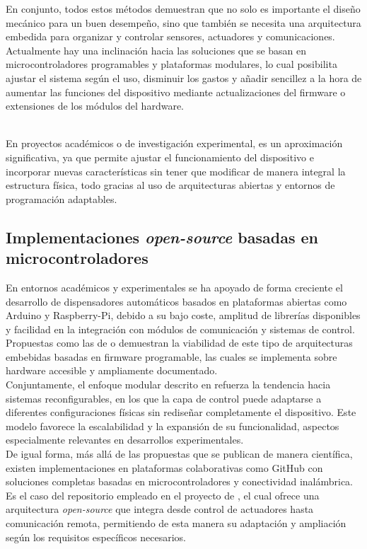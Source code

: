 En conjunto, todos estos métodos demuestran que no solo es importante el diseño mecánico para un buen desempeño, sino que también se necesita una arquitectura embedida para organizar y controlar sensores, actuadores y comunicaciones. Actualmente hay una inclinación hacia las soluciones que se basan en microcontroladores programables y plataformas modulares, lo cual posibilita ajustar el sistema según el uso, disminuir los gastos y añadir sencillez a la hora de aumentar las funciones del dispositivo mediante actualizaciones del firmware o extensiones de los módulos del hardware.\\

\

En proyectos académicos o de investigación experimental, es un aproximación significativa, ya que permite ajustar el funcionamiento del dispositivo e incorporar nuevas características sin tener que modificar de manera integral la estructura física, todo gracias al uso de arquitecturas abiertas y entornos de programación adaptables.\\

\subsection{Implementaciones \textit{open-source} basadas en microcontroladores}
\label{subsec:open_source_microcontroladores}

En entornos académicos y experimentales se ha apoyado de forma creciente el desarrollo de dispensadores automáticos basados en plataformas abiertas como Arduino y Raspberry-Pi, debido a su bajo coste, amplitud de librerías disponibles y facilidad en la integración con módulos de comunicación y sistemas de control. Propuestas como las de \cite{iot2020} o \cite{intelligent2023} demuestran la viabilidad de este tipo de arquitecturas embebidas basadas en firmware programable, las cuales se implementa sobre hardware accesible y ampliamente documentado.\\

Conjuntamente, el enfoque modular descrito en \cite{alduaij2024} refuerza la tendencia hacia sistemas reconfigurables, en los que la capa de control puede adaptarse a diferentes configuraciones físicas sin rediseñar completamente el dispositivo. Este modelo favorece la escalabilidad y la expansión de su funcionalidad, aspectos especialmente relevantes en desarrollos experimentales.\\

De igual forma, más allá de las propuestas que se publican de manera científica, existen implementaciones en plataformas colaborativas como GitHub con soluciones completas basadas en microcontroladores y conectividad inalámbrica. Es el caso del repositorio empleado en el proyecto de \cite{repo_github}, el cual ofrece una arquitectura \textit{open-source} que integra desde control de actuadores hasta comunicación remota, permitiendo de esta manera su adaptación y ampliación según los requisitos específicos necesarios.\\

